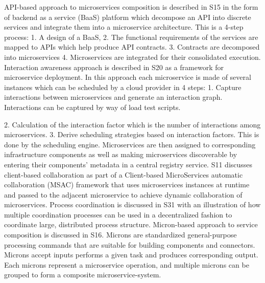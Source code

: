 \documentclass{article}
\begin{document}
\begin{multicols}{2}
API-based approach to microservices composition is described in S15 in the form of backend as a service (BaaS) platform which decompose an API into discrete services and integrate them into a microservice architecture. This is a 4-step process: 1. A design of a BaaS, 2. The functional requirements of the services are mapped to APIs which help produce API contracts. 3. Contracts are decomposed into microservices 4. Microservices are integrated for their consolidated execution. 
Interaction awareness approach is described in S20 as a framework for microservice deployment. In this approach each microservice is made of several instances which can be scheduled by a cloud provider in 4 steps: 1. Capture interactions between microservices and generate an interaction graph. Interactions can be captured by way of load test scripts.

2. Calculation of the interaction factor which is the number of interactions among microservices. 3. Derive scheduling strategies based on interaction factors. This is done by the scheduling engine. Microservices are then assigned to corresponding infrastructure components as well as making microservices discoverable by entering their components’ metadata in a central registry service. 
S11 discusses client-based collaboration as part of a Client-based MicroServices automatic collaboration (MSAC) framework that uses microservices instances at runtime and passed to the adjacent microservice to achieve dynamic collaboration of microservices. Process coordination is discussed in S31 with an illustration of how multiple coordination processes can be used in a decentralized fashion to coordinate large, distributed process structure. Micron-based approach to service composition is discussed in S16. Microns are standardized general-purpose processing commands that are suitable for building components and connectors. Microns accept inputs performs a given task and produces corresponding output. Each microns represent a microservice operation, and multiple microns can be grouped to form a composite microservice-system. 


\end{multicols}
\end{document}
